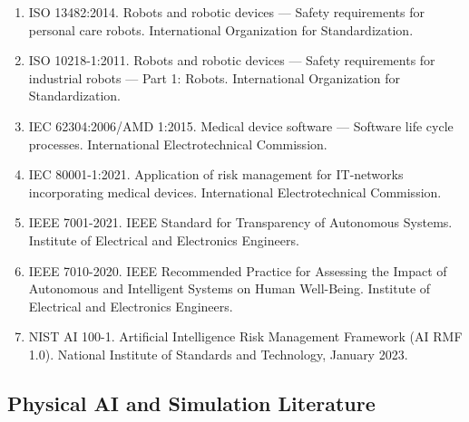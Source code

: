 \begin{enumerate}[resume]
\item ISO 13482:2014. Robots and robotic devices --- Safety requirements for personal care robots. International Organization for Standardization.

\item ISO 10218-1:2011. Robots and robotic devices --- Safety requirements for industrial robots --- Part 1: Robots. International Organization for Standardization.

\item IEC 62304:2006/AMD 1:2015. Medical device software --- Software life cycle processes. International Electrotechnical Commission.

\item IEC 80001-1:2021. Application of risk management for IT-networks incorporating medical devices. International Electrotechnical Commission.

\item IEEE 7001-2021. IEEE Standard for Transparency of Autonomous Systems. Institute of Electrical and Electronics Engineers.

\item IEEE 7010-2020. IEEE Recommended Practice for Assessing the Impact of Autonomous and Intelligent Systems on Human Well-Being. Institute of Electrical and Electronics Engineers.

\item NIST AI 100-1. Artificial Intelligence Risk Management Framework (AI RMF 1.0). National Institute of Standards and Technology, January 2023.
\end{enumerate}

\subsection*{Physical AI and Simulation Literature}

